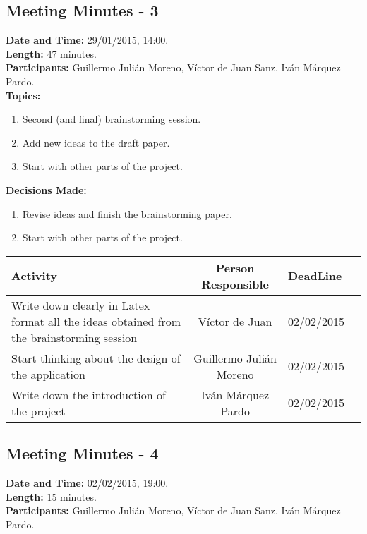 \subsection{Meeting Minutes - 3}
\textbf{Date and Time:} 29/01/2015, 14:00. \\
\textbf{Length:} 47 minutes. \\
\textbf{Participants: } Guillermo Julián Moreno, Víctor de Juan Sanz, Iván Márquez Pardo.\\

\textbf{Topics: } 
\begin{enumerate}
\item Second (and final) brainstorming session.
\item Add new ideas to the draft paper.
\item Start with other parts of the project.
\end{enumerate}

\textbf{Decisions Made:}\\
\begin{enumerate}
\item Revise ideas and finish the brainstorming paper.
\item Start with other parts of the project.
\end{enumerate}

\begin{tabular}{|p{5cm} | c|p{5cm}| p{2cm}|}
\hline Activity & Person Responsible & DeadLine \\\hline
Write down clearly in Latex format all the ideas obtained from the brainstorming session & Víctor de Juan & 02/02/2015\\\hline

Start thinking about the design of the application & Guillermo Julián Moreno & 02/02/2015\\\hline

Write down the introduction of the project & Iván Márquez Pardo & 02/02/2015\\\hline
\end{tabular}


\subsection{Meeting Minutes - 4}
\textbf{Date and Time:} 02/02/2015, 19:00. \\
\textbf{Length:} 15 minutes. \\
\textbf{Participants: } Guillermo Julián Moreno, Víctor de Juan Sanz, Iván Márquez Pardo.\\


